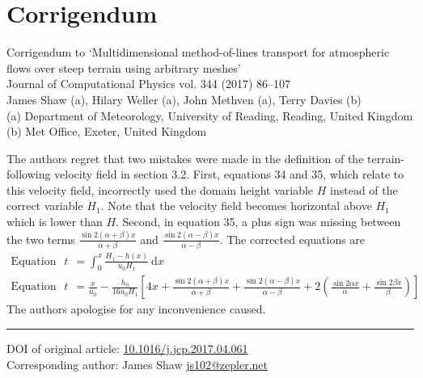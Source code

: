 \documentclass[a4]{article}
\begin{document}
\section*{Corrigendum}

Corrigendum to `Multidimensional method-of-lines transport for atmospheric flows over steep terrain using arbitrary meshes' \\
Journal of Computational Physics vol. 344 (2017) 86--107 \\
James Shaw (a), Hilary Weller (a), John Methven (a), Terry Davies (b) \\
(a) Department of Meteorology, University of Reading, Reading, United Kingdom
(b) Met Office, Exeter, United Kingdom

\vspace{1em}
The authors regret that two mistakes were made in the definition of the terrain-following velocity field in section 3.2.  First, equations 34 and 35, which relate to this velocity field, incorrectly used the domain height variable $H$ instead of the correct variable $H_1$.  Note that the velocity field becomes horizontal above $H_1$ which is lower than $H$.  Second, in equation 35, a plus sign was missing between the two terms $\frac{\sin 2 (\alpha + \beta) x}{\alpha + \beta}$ and $\frac{\sin 2(\alpha - \beta) x}{\alpha - \beta}$.
The corrected equations are
\begin{align*}
\text{Equation 34: }t &= \int_0^x \frac{H_1 - h(x)}{u_0 H_1}\:\mathrm{d}x \\
\text{Equation 35: }t &= \frac{x}{u_0} - \frac{h_0}{16 u_0 H_1} \left[ 4x + \frac{\sin 2 (\alpha + \beta) x}{\alpha + \beta} + \frac{\sin 2(\alpha - \beta) x}{\alpha - \beta} + 2 \left( \frac{\sin 2\alpha x}{\alpha}  + \frac{\sin 2\beta x}{\beta} \right) \right]
\end{align*}
The authors apologise for any inconvenience caused.

\vspace{6em}

\hrule

\vspace{1em}

DOI of original article: \href{https://doi.org/10.1016/j.jcp.2017.04.061}{10.1016/j.jcp.2017.04.061} \\
\unskip Corresponding author: James Shaw \href{mailto:js102@zepler.net}{js102@zepler.net}
\end{document}

